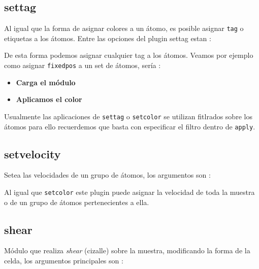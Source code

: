 \subsection{settag}
Al igual que la forma de asignar colores a un \'atomo, es posible asignar
\verb|tag| o etiquetas a los \'atomos. Entre las opciones del plugin settag
estan :


De esta forma podemos asignar cualquier tag a los \'atomos. Veamos por ejemplo
como asignar \verb|fixedpos| a un set de \'atomos, ser\'ia :

\begin{itemize}
 \item \textbf{Carga el m\'odulo}
 \item \textbf{Aplicamos el color}
\end{itemize}

Usualmente las aplicaciones de \verb|settag| o \verb|setcolor| se utilizan
fitlrados sobre los \'atomos para ello recuerdemos que basta con especificar el
filtro dentro de \verb|apply|.

\subsection{setvelocity}
Setea las velocidades de un grupo de \'atomos, los argumentos son :


Al igual que \verb|setcolor| este plugin puede asignar la velocidad de toda la
muestra o de un grupo de \'atomos pertenecientes a ella.

\subsection{shear}
M\'odulo que realiza \textit{shear} (cizalle) sobre la muestra, modificando la
forma de la celda, los argumentos principales son :

